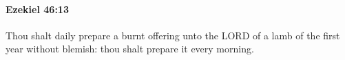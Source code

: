 
		\paragraph{Ezekiel 46:13} %
			\label{EZEKIEL-46-13}

			Thou shalt daily prepare a burnt offering unto the LORD of a lamb of the first year without blemish: thou shalt prepare it every morning.


